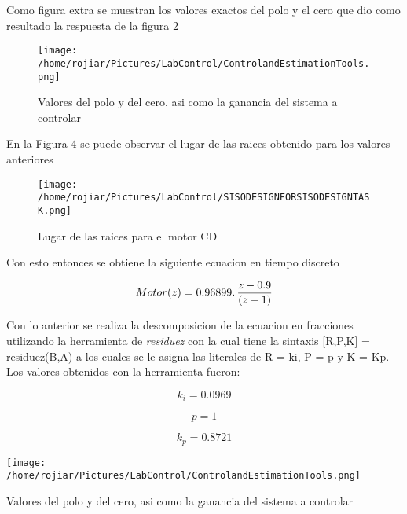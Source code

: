 \documentclass[a4paper,10pt,twocolumn]{article}
\begin{document}
Como figura extra se muestran los valores exactos del polo y el cero que dio como resultado la respuesta de la figura 2

\begin{figure}[h!]
\centering
\texttt{[image: /home/rojiar/Pictures/LabControl/ControlandEstimationTools.png]}
\caption{Valores del polo y del cero, asi como la ganancia del sistema a controlar}
\label{Valores del polo y del cero, asi como la ganancia del sistema a controlar}
\end{figure}

En la Figura 4 se puede observar el lugar de las raices obtenido para los valores anteriores

\begin{figure}[h!]
\centering
\texttt{[image: /home/rojiar/Pictures/LabControl/SISODESIGNFORSISODESIGNTASK.png]}
\caption{Lugar de las raices para el motor CD}
\label{Lugar de las raices para el motor CD}
\end{figure}

Con esto entonces se obtiene la siguiente ecuacion en tiempo discreto

\begin{center}
$$
 Motor(z) = 0.96899 \ldotp \frac{z-0.9}{(z-1)}
$$
\end{center}

\newpage

Con lo anterior se realiza la descomposicion de la ecuacion en fracciones utilizando la herramienta de \textit{residuez} con la cual tiene
la sintaxis [R,P,K] = residuez(B,A) a los cuales se le asigna las literales de R = ki, P = p y K = Kp. Los valores obtenidos con la
herramienta fueron:

\begin{center}
$$
  k_{i} = 0.0969
$$
\end{center}

\begin{center}
$$
  p = 1
$$
\end{center}

\begin{center}
$$
  k_{p} = 0.8721
$$
\end{center}

\begin{table}
\centering
\texttt{[image: /home/rojiar/Pictures/LabControl/ControlandEstimationTools.png]}
\caption{Valores del polo y del cero, asi como la ganancia del sistema a controlar}
\label{Valores del polo y del cero, asi como la ganancia del sistema a controlar}
\end{table}
\end{document}
